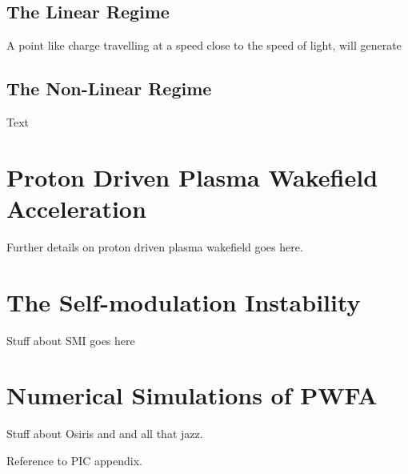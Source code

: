 \subsection{The Linear Regime}
\label{Int:PWFA:Lin}

A point like charge travelling at a speed close to the speed of light, will generate 

\subsection{The Non-Linear Regime}
\label{Int:PWFA:NLin}

Text

\section{Proton Driven Plasma Wakefield Acceleration}
\label{Int:PDPWFA}

Further details on proton driven plasma wakefield goes here.

\section{The Self-modulation Instability}
\label{Int:SMI}

Stuff about SMI goes here

\section{Numerical Simulations of PWFA}
\label{Int:Sim}

Stuff about Osiris and and all that jazz.

Reference to PIC appendix.


